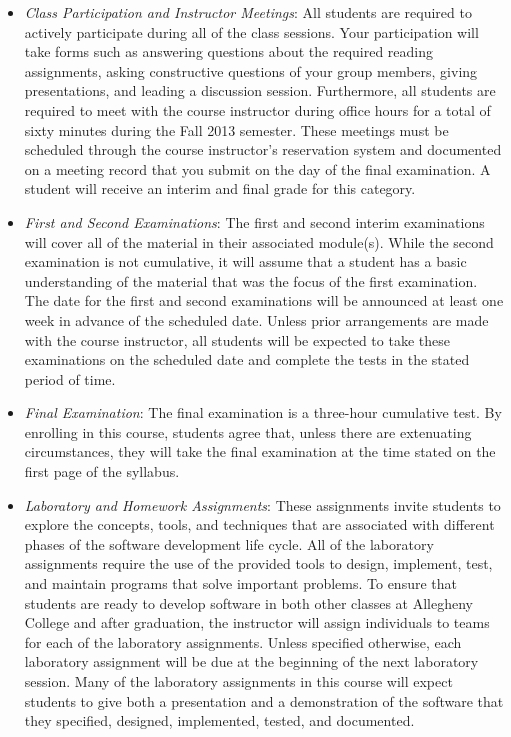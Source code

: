 \begin{itemize}

	\item {\em Class Participation and Instructor Meetings}: All students are required to actively participate during
		all of the class sessions. Your participation will take forms such as answering questions about the required
		reading assignments, asking constructive questions of your group members, giving presentations, and leading a
		discussion session. Furthermore, all students are required to meet with the course instructor during office
		hours for a total of sixty minutes during the Fall 2013 semester.  These meetings must be scheduled through the
		course instructor's reservation system and documented on a meeting record that you submit on the day of the final
		examination. A student will receive an interim and final grade for this category.

	\item {\em First and Second Examinations}: The first and second interim examinations will cover all of the material
		in their associated module(s).  While the second examination is not cumulative, it will assume that a student has a
		basic understanding of the material that was the focus of the first examination.  The date for the first and
		second examinations will be announced at least one week in advance of the scheduled date.  Unless prior
		arrangements are made with the course instructor, all students will be expected to take these examinations on the
		scheduled date and complete the tests in the stated period of time.

	\item {\em Final Examination}: The final examination is a three-hour cumulative test.  By enrolling in this course,
		students agree that, unless there are extenuating circumstances, they will take the final examination at the
		time stated on the first page of the syllabus.

	\item {\em Laboratory and Homework Assignments}: These assignments invite students to explore the concepts, tools,
		and techniques that are associated with different phases of the software development life cycle.  All of the
		laboratory assignments require the use of the provided tools to design, implement, test, and maintain programs
		that solve important problems.  To ensure that students are ready to develop software in both other classes at
		Allegheny College and after graduation, the instructor will assign individuals to teams for each of the
		laboratory assignments.  Unless specified otherwise, each laboratory assignment will be due at the beginning of
		the next laboratory session.  Many of the laboratory assignments in this course will expect students to
		give both a presentation and a demonstration of the software that they specified, designed, implemented, tested,
		and documented.  
	

\end{itemize}
